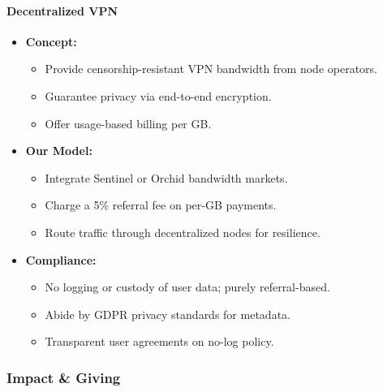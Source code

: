 \documentclass[13pt]{extarticle}
\begin{document}
\paragraph{Decentralized VPN}
\begin{itemize}[left=1em]
  \item \textbf{Concept:}
    \begin{itemize}[left=1.2em]
      \item Provide censorship-resistant VPN bandwidth from node operators.
      \item Guarantee privacy via end-to-end encryption.
      \item Offer usage-based billing per GB.
    \end{itemize}
  \item \textbf{Our Model:}
    \begin{itemize}[left=1.2em]
      \item Integrate Sentinel or Orchid bandwidth markets.
      \item Charge a 5\% referral fee on per-GB payments.
      \item Route traffic through decentralized nodes for resilience.
    \end{itemize}
  \item \textbf{Compliance:}
    \begin{itemize}[left=1.2em]
      \item No logging or custody of user data; purely referral-based.
      \item Abide by GDPR privacy standards for metadata.
      \item Transparent user agreements on no-log policy.
    \end{itemize}
\end{itemize}

\subsubsection{Impact \& Giving}
\end{document}
